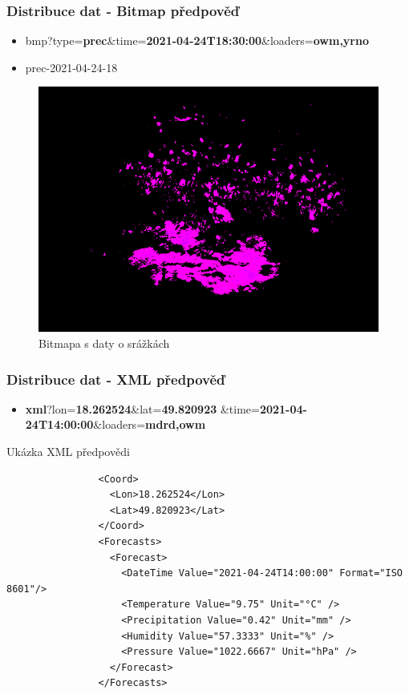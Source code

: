 \documentclass{beamer}
\begin{document}
	\begin{frame}
		\frametitle{Distribuce dat - Bitmap předpověď}
		
		\begin{itemize}			
			\item bmp?type=\textbf{prec}\&time=\textbf{2021-04-24T18:30:00}\&loaders=\textbf{owm,yrno}
			\item prec-2021-04-24-18
		\end{itemize}
		
		\begin{figure}
			
			\includegraphics[scale=0.35]{figures/bmp_prec.PNG}
			\caption{Bitmapa s daty o srážkách}
			
		\end{figure}
		
	\end{frame}
	
	\begin{frame}[fragile]
		\frametitle{Distribuce dat - XML předpověď}
		
		\begin{itemize}
			\item \textbf{xml}?lon=\textbf{18.262524}\&lat=\textbf{49.820923}
			\&time=\textbf{2021-04-24T14:00:00}\&loaders=\textbf{mdrd,owm}
		\end{itemize}
		
		\begin{exampleblock}{Ukázka XML předpovědi}
			\begin{verbatim}
				<Coord>
				  <Lon>18.262524</Lon>
				  <Lat>49.820923</Lat>
				</Coord>
				<Forecasts>
				  <Forecast>
				    <DateTime Value="2021-04-24T14:00:00" Format="ISO 8601"/>
				    <Temperature Value="9.75" Unit="°C" />
				    <Precipitation Value="0.42" Unit="mm" />
				    <Humidity Value="57.3333" Unit="%" />
				    <Pressure Value="1022.6667" Unit="hPa" />
				  </Forecast>
				</Forecasts>
			\end{verbatim}
		\end{exampleblock}
	\end{frame}
	
\end{document}
